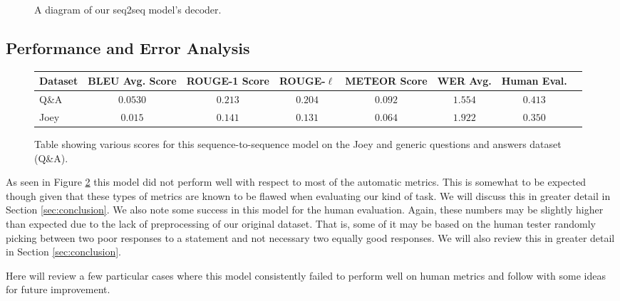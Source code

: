 \begin{figure}
	\begin{center}
	\end{center}
	\caption{A diagram of our seq2seq model's decoder.}
	\label{fig:s2s_model_decoder}
\end{figure} 

\subsection{Performance and Error Analysis}

\begin{figure}
\begin{center}
	\scalebox{.8}
	{
	\begin{tabular}{ |l|c|c|c|c|c|c|c| } 
		\hline
		\textbf{Dataset} & \textbf{BLEU Avg. Score} & \textbf{ROUGE-1 Score} & \textbf{ROUGE-$\ell$} & \textbf{METEOR Score} & \textbf{WER Avg.} & \textbf{Human Eval.}\\
		\hline
		Q\&A & $0.0530$ & $0.213$ & $0.204$ & $0.092$ & $1.554$ & $0.413$\\
		\hline
		Joey & $0.015$ & $0.141$ & $0.131$ & $0.064$ & $1.922$ & $0.350$\\ 
		\hline
	\end{tabular}
	}
\end{center}
\label{fig:s2s_data}
\caption{Table showing various scores for this sequence-to-sequence model on the Joey and generic questions and answers dataset (Q\&A).}
\end{figure}

As seen in Figure \ref{fig:s2s_data} this model did not perform well with respect to most of the automatic metrics.
This is somewhat to be expected though given that these types of metrics are known to be flawed when evaluating our kind of task.
We will discuss this in greater detail in Section \ref{sec:conclusion}.
We also note some success in this model for the human evaluation.
Again, these numbers may be slightly higher than expected due to the lack of preprocessing of our original dataset.
That is, some of it may be based on the human tester randomly picking between two poor responses to a statement and not necessary two equally good responses. 
We will also review this in greater detail in Section \ref{sec:conclusion}.

Here will review a few particular cases where this model consistently failed to perform well on human metrics and follow with some ideas for future improvement.

